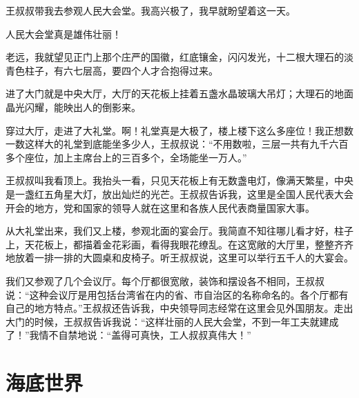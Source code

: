 \documentclass[12pt,UTF-8,openany]{ctexbook}
\begin{document}
\begin{Large}
    
    王叔叔带我去参观人民大会堂。我高兴极了，我早就盼望着这一天。
    
    人民大会堂真是雄伟壮丽！
    
    老远，我就望见正门上那个庄严的国徽，红底镶金，闪闪发光，十二根大理石的淡青色柱子，有六七层高，要四个人才合抱得过来。
    
    进了大门就是中央大厅，大厅的天花板上挂着五盏水晶玻璃大吊灯；大理石的地面晶光闪耀，能映出人的倒影来。
    
    穿过大厅，走进了大礼堂。啊！礼堂真是大极了，楼上楼下这么多座位！我正想数一数这样大的礼堂到底能坐多少人，王叔叔说：“不用数啦，三层一共有九千六百多个座位，加上主席台上的三百多个，全场能坐一万人。”
    
    王叔叔叫我看顶上。我抬头一看，只见天花板上有无数盏电灯，像满天繁星，中央是一盏红五角星大灯，放出灿烂的光芒。王叔叔告诉我，这里是全国人民代表大会开会的地方，党和国家的领导人就在这里和各族人民代表商量国家大事。
    
    从大礼堂出来，我们又上楼，参观北面的宴会厅。我简直不知往哪儿看才好，柱子上，天花板上，都描着金花彩画，看得我眼花缭乱。在这宽敞的大厅里，整整齐齐地放着一排一排的大圆桌和皮椅子。听王叔叔说，这里可以举行五千人的大宴会。
    
    我们又参观了几个会议厅。每个厅都很宽敞，装饰和摆设各不相同，王叔叔说：“这种会议厅是用包括台湾省在内的省、市自治区的名称命名的。各个厅都有自己的地方特点。”王叔叔还告诉我，中央领导同志经常在这里会见外国朋友。走出大门的时候，王叔叔告诉我说：“这样壮丽的人民大会堂，不到一年工夫就建成了！”我情不自禁地说：“盖得可真快，工人叔叔真伟大！”
    
\end{Large}

\chapter{海底世界}
\end{document}

